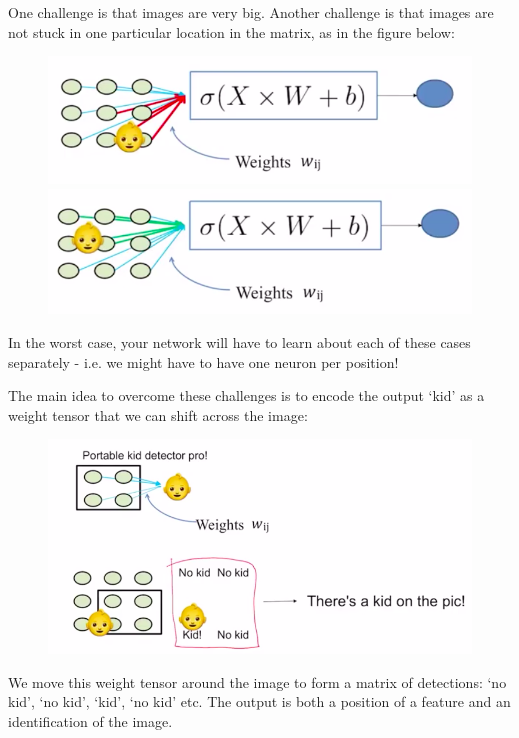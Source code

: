 One challenge is that images are very big. Another challenge is that images are not stuck in one particular location in the matrix, as in the figure below:
\begin{figure}[H]
\centering
\includegraphics[scale=0.4]{imagelocation1.png}
\includegraphics[scale=0.4]{imagelocation2.png}
\end{figure}
In the worst case, your network will have to learn about each of these cases separately - i.e. we might have to have one neuron per position!




\newpage
The main idea to overcome these challenges is to encode the output `kid' as a weight tensor that we can shift across the image:

\begin{figure}[H]
\centering
\includegraphics[scale=0.4]{portabledetector.png}
\end{figure}

We move this weight tensor around the image to form a matrix of detections: `no kid', `no kid', `kid', `no kid' etc. The output is both a position of a feature and an identification of the image.\\


